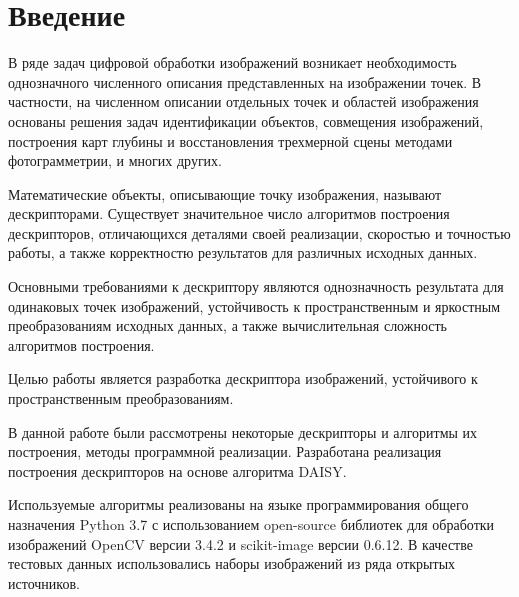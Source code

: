 \newpage
{}
{}
\section*{Введение}
{	
	В ряде задач цифровой обработки изображений возникает необходимость однозначного численного описания представленных на изображении точек. В частности, на численном описании отдельных точек и областей изображения основаны решения задач идентификации объектов, совмещения изображений, построения карт глубины и восстановления трехмерной сцены методами фотограмметрии, и многих других.
	
	Математические объекты, описывающие точку изображения, называют дескрипторами. Существует значительное число алгоритмов построения дескрипторов, отличающихся деталями своей реализации, скоростью и точностью работы, а также корректностю результатов для различных исходных данных. 
	
	Основными требованиями к дескриптору являются однозначность результата для одинаковых точек изображений, устойчивость к пространственным и яркостным преобразованиям исходных данных, а также вычислительная сложность алгоритмов построения. 
	
	Целью работы является разработка дескриптора изображений, устойчивого к пространственным преобразованиям.
	
	В данной работе были рассмотрены некоторые дескрипторы и алгоритмы их построения, методы программной реализации. Разработана реализация построения дескрипторов на основе алгоритма DAISY.  
	
	Используемые алгоритмы реализованы на языке программирования общего назначения Python 3.7 с использованием open-source библиотек для обработки изображений OpenCV версии 3.4.2 и scikit-image версии 0.6.12. В качестве тестовых данных использовались наборы изображений из ряда открытых источников.
}

\newpage

